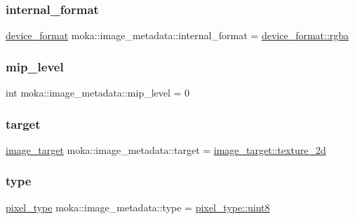 \subsubsection{\texorpdfstring{internal\_format}{internal\_format}}
{\footnotesize\ttfamily \mbox{\hyperlink{namespacemoka_ac2d188857be60286ff735744a33ebd2d}{device\+\_\+format}} moka\+::image\+\_\+metadata\+::internal\+\_\+format = \mbox{\hyperlink{namespacemoka_a1989c05aecf3bb10bbf8a7027e3df130a7082a31b8759c9d59795876351ec63aa}{device\+\_\+format\+::rgba}}}

\mbox{\label{structmoka_1_1image__metadata_abe30b703008614451bce6940131fda56}} 
\subsubsection{\texorpdfstring{mip\_level}{mip\_level}}
{\footnotesize\ttfamily int moka\+::image\+\_\+metadata\+::mip\+\_\+level = 0}

\mbox{\label{structmoka_1_1image__metadata_a6ae2456df2d95e2c67e255dc837465a4}} 
\subsubsection{\texorpdfstring{target}{target}}
{\footnotesize\ttfamily \mbox{\hyperlink{namespacemoka_a6f402ae62a72ce17ff73fa94d526800e}{image\+\_\+target}} moka\+::image\+\_\+metadata\+::target = \mbox{\hyperlink{namespacemoka_a259bf395c8f07bd8d13515efcb542623ade86992194d08494a0a0e208a3660f31}{image\+\_\+target\+::texture\+\_\+2d}}}

\mbox{\label{structmoka_1_1image__metadata_adb23e7386e2e515b137f9282770a2819}} 
\subsubsection{\texorpdfstring{type}{type}}
{\footnotesize\ttfamily \mbox{\hyperlink{namespacemoka_a067d388d48715c4e725cd426d5bf3770}{pixel\+\_\+type}} moka\+::image\+\_\+metadata\+::type = \mbox{\hyperlink{namespacemoka_a32244b0de63481283738e2db11639e3fa5f423e669d0a8f4ab7c4c3e6da27161a}{pixel\+\_\+type\+::uint8}}}

